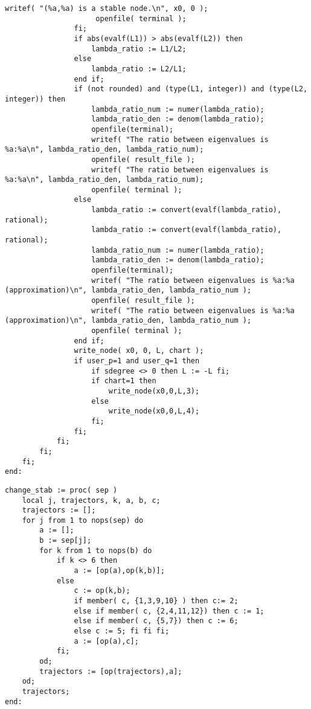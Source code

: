 \documentclass[a4paper,10pt]{article}
\begin{document}
\begin{lstlisting}[name=infinity]
                     writef( "(%a,%a) is a stable node.\n", x0, 0 );
                     openfile( terminal );
                fi;
                if abs(evalf(L1)) > abs(evalf(L2)) then
                    lambda_ratio := L1/L2;
                else
                    lambda_ratio := L2/L1;
                end if;
                if (not rounded) and (type(L1, integer)) and (type(L2, integer)) then 
                    lambda_ratio_num := numer(lambda_ratio);
                    lambda_ratio_den := denom(lambda_ratio);
                    openfile(terminal);
                    writef( "The ratio between eigenvalues is %a:%a\n", lambda_ratio_den, lambda_ratio_num);
                    openfile( result_file );
                    writef( "The ratio between eigenvalues is %a:%a\n", lambda_ratio_den, lambda_ratio_num);
                    openfile( terminal );
                else
                    lambda_ratio := convert(evalf(lambda_ratio), rational);
                    lambda_ratio := convert(evalf(lambda_ratio), rational);
                    lambda_ratio_num := numer(lambda_ratio);
                    lambda_ratio_den := denom(lambda_ratio);
                    openfile(terminal);
                    writef( "The ratio between eigenvalues is %a:%a (approximation)\n", lambda_ratio_den, lambda_ratio_num );
                    openfile( result_file );
                    writef( "The ratio between eigenvalues is %a:%a (approximation)\n", lambda_ratio_den, lambda_ratio_num );
                    openfile( terminal );
                end if;
                write_node( x0, 0, L, chart );
                if user_p=1 and user_q=1 then
                    if sdegree <> 0 then L := -L fi;
                    if chart=1 then
                        write_node(x0,0,L,3);
                    else
                        write_node(x0,0,L,4);
                    fi;
                fi;
            fi;
        fi;
    fi;
end:
\end{lstlisting}

\begin{lstlisting}[name=infinity]
change_stab := proc( sep )
    local j, trajectors, k, a, b, c;
    trajectors := [];
    for j from 1 to nops(sep) do
        a := [];
        b := sep[j];
        for k from 1 to nops(b) do
            if k <> 6 then
                a := [op(a),op(k,b)];
            else
                c := op(k,b);
                if member( c, {1,3,9,10} ) then c:= 2;
                else if member( c, {2,4,11,12}) then c := 1;
                else if member( c, {5,7}) then c := 6;
                else c := 5; fi fi fi;
                a := [op(a),c];
            fi;
        od;
        trajectors := [op(trajectors),a];
    od;
    trajectors;
end:
\end{lstlisting}
\end{document}
